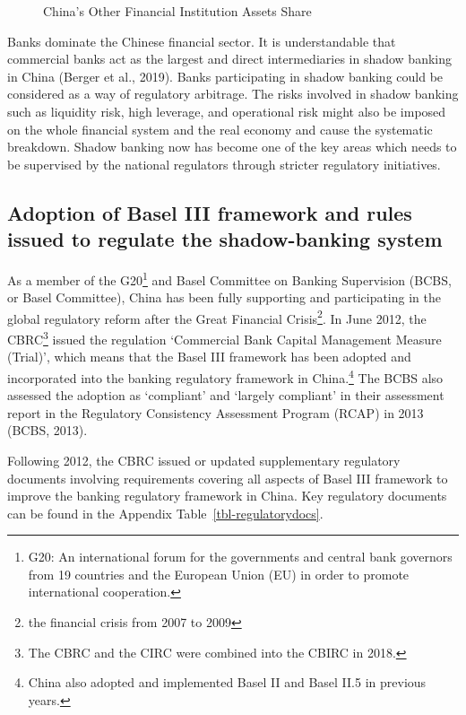 \documentclass[
  12pt,
  a4paper,
]{scrreprt}
\begin{document}
{{{{\begin{figure}
{}

\caption{\label{fig-shadowbanking}China's Other Financial Institution
Assets Share}

\end{figure}%

Banks dominate the Chinese financial sector. It is understandable that
commercial banks act as the largest and direct intermediaries in shadow
banking in China (Berger et al., 2019). Banks participating in shadow
banking could be considered as a way of regulatory arbitrage. The risks
involved in shadow banking such as liquidity risk, high leverage, and
operational risk might also be imposed on the whole financial system and
the real economy and cause the systematic breakdown. Shadow banking now
has become one of the key areas which needs to be supervised by the
national regulators through stricter regulatory initiatives.

\subsection{Adoption of Basel III framework and rules issued to regulate
the shadow-banking
system}\label{adoption-of-basel-iii-framework-and-rules-issued-to-regulate-the-shadow-banking-system}

As a member of the G20\footnote{G20: An international forum for the
  governments and central bank governors from 19 countries and the
  European Union (EU) in order to promote international cooperation.}
and Basel Committee on Banking Supervision (BCBS, or Basel Committee),
China has been fully supporting and participating in the global
regulatory reform after the Great Financial Crisis\footnote{the
  financial crisis from 2007 to 2009}. In June 2012, the CBRC\footnote{The
  CBRC and the CIRC were combined into the CBIRC in 2018.} issued the
regulation `Commercial Bank Capital Management Measure (Trial)', which
means that the Basel III framework has been adopted and incorporated
into the banking regulatory framework in China.\footnote{China also
  adopted and implemented Basel II and Basel II.5 in previous years.}
The BCBS also assessed the adoption as `compliant' and `largely
compliant' in their assessment report in the Regulatory Consistency
Assessment Program (RCAP) in 2013 (BCBS, 2013).

Following 2012, the CBRC issued or updated supplementary regulatory
documents involving requirements covering all aspects of Basel III
framework to improve the banking regulatory framework in China. Key
regulatory documents can be found in the Appendix
Table~\ref{tbl-regulatorydocs}.

}}}}
\end{document}

